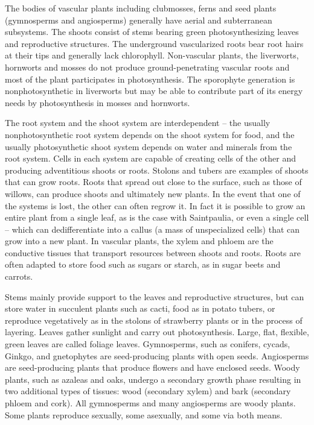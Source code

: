 \documentclass[]{book}
\theoremstyle{definition}
\theoremstyle{definition}
\theoremstyle{definition}
\theoremstyle{remark}
\begin{document}
The bodies of vascular plants including clubmosses, ferns and seed
plants (gymnosperms and angiosperms) generally have aerial and
subterranean subsystems. The shoots consist of stems bearing green
photosynthesizing leaves and reproductive structures. The underground
vascularized roots bear root hairs at their tips and generally lack
chlorophyll. Non-vascular plants, the liverworts, hornworts and mosses
do not produce ground-penetrating vascular roots and most of the plant
participates in photosynthesis. The sporophyte generation is
nonphotosynthetic in liverworts but may be able to contribute part of
its energy needs by photosynthesis in mosses and hornworts.

The root system and the shoot system are interdependent -- the usually
nonphotosynthetic root system depends on the shoot system for food, and
the usually photosynthetic shoot system depends on water and minerals
from the root system. Cells in each system are capable of creating cells
of the other and producing adventitious shoots or roots. Stolons and
tubers are examples of shoots that can grow roots. Roots that spread out
close to the surface, such as those of willows, can produce shoots and
ultimately new plants. In the event that one of the systems is lost, the
other can often regrow it. In fact it is possible to grow an entire
plant from a single leaf, as is the case with Saintpaulia, or even a
single cell -- which can dedifferentiate into a callus (a mass of
unspecialized cells) that can grow into a new plant. In vascular plants,
the xylem and phloem are the conductive tissues that transport resources
between shoots and roots. Roots are often adapted to store food such as
sugars or starch, as in sugar beets and carrots.

Stems mainly provide support to the leaves and reproductive structures,
but can store water in succulent plants such as cacti, food as in potato
tubers, or reproduce vegetatively as in the stolons of strawberry plants
or in the process of layering. Leaves gather sunlight and carry out
photosynthesis. Large, flat, flexible, green leaves are called foliage
leaves. Gymnosperms, such as conifers, cycads, Ginkgo, and gnetophytes
are seed-producing plants with open seeds. Angiosperms are
seed-producing plants that produce flowers and have enclosed seeds.
Woody plants, such as azaleas and oaks, undergo a secondary growth phase
resulting in two additional types of tissues: wood (secondary xylem) and
bark (secondary phloem and cork). All gymnosperms and many angiosperms
are woody plants. Some plants reproduce sexually, some asexually, and
some via both means.
\end{document}
